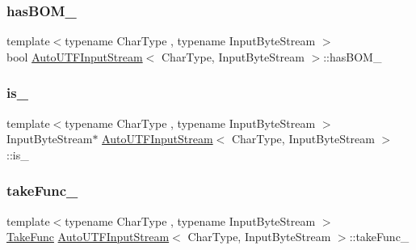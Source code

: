 \subsubsection{\texorpdfstring{has\+B\+O\+M\+\_\+}{hasBOM\_}}
{\footnotesize\ttfamily template$<$typename Char\+Type , typename Input\+Byte\+Stream $>$ \\
bool \hyperlink{classAutoUTFInputStream}{Auto\+U\+T\+F\+Input\+Stream}$<$ Char\+Type, Input\+Byte\+Stream $>$\+::has\+B\+O\+M\+\_\+\hspace{0.3cm}{\ttfamily [private]}}

\mbox{\label{classAutoUTFInputStream_aee206b352000902d02dac147761a61dc}} 
\subsubsection{\texorpdfstring{is\+\_\+}{is\_}}
{\footnotesize\ttfamily template$<$typename Char\+Type , typename Input\+Byte\+Stream $>$ \\
Input\+Byte\+Stream$\ast$ \hyperlink{classAutoUTFInputStream}{Auto\+U\+T\+F\+Input\+Stream}$<$ Char\+Type, Input\+Byte\+Stream $>$\+::is\+\_\+\hspace{0.3cm}{\ttfamily [private]}}

\mbox{\label{classAutoUTFInputStream_a8996755d783dcae9049d9f1ad96391fb}} 
\subsubsection{\texorpdfstring{take\+Func\+\_\+}{takeFunc\_}}
{\footnotesize\ttfamily template$<$typename Char\+Type , typename Input\+Byte\+Stream $>$ \\
\hyperlink{classAutoUTFInputStream_a106a0af4b098cc88e1dba285b8f563ae}{Take\+Func} \hyperlink{classAutoUTFInputStream}{Auto\+U\+T\+F\+Input\+Stream}$<$ Char\+Type, Input\+Byte\+Stream $>$\+::take\+Func\+\_\+\hspace{0.3cm}{\ttfamily [private]}}

\mbox{\label{classAutoUTFInputStream_aef307895f82bc15a7a37ded277aefe2e}} 
